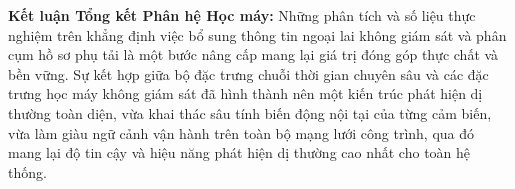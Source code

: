 \noindent\textbf{Kết luận Tổng kết Phân hệ Học máy:} Những phân tích và số liệu thực nghiệm trên khẳng định việc bổ sung thông tin ngoại lai không giám sát và phân cụm hồ sơ phụ tải là một bước nâng cấp mang lại giá trị đóng góp thực chất và bền vững. Sự kết hợp giữa bộ đặc trưng chuỗi thời gian chuyên sâu và các đặc trưng học máy không giám sát đã hình thành nên một kiến trúc phát hiện dị thường toàn diện, vừa khai thác sâu tính biến động nội tại của từng cảm biến, vừa làm giàu ngữ cảnh vận hành trên toàn bộ mạng lưới công trình, qua đó mang lại độ tin cậy và hiệu năng phát hiện dị thường cao nhất cho toàn hệ thống.
